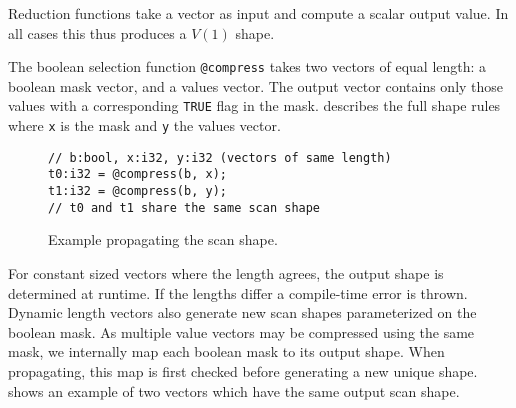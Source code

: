 Reduction functions take a vector as input and compute a scalar output value.  In all
cases this thus produces a $V(1)$ shape.

\begin{comment}
\begin{table}[htbp]
\centering
\caption{Rules for reduction functions (R)} \label{rule_reduction}
\begin{small}
\begin{tabular}{|c||c|c|c|c|}
\hline
$F_{R}$(x) & \shapeS & \shapeV{$c_0$} & \shapeV{$d_0$} & \shapeVS{$a_0$} \\ \hline
\hline
Return     & \shapeS & \shapeS & \shapeS & \shapeS \\ \hline
\end{tabular}
\end{small}
\end{table}
\end{comment}

The boolean selection function \texttt{@compress} takes two vectors of equal
length: a boolean mask vector, and a values vector. The output vector contains only
those values with a corresponding \texttt{TRUE} flag in the mask. 
describes the full shape rules where \texttt{x} is the mask and \texttt{y} the values
vector.

\begin{figure}[htbp]
\begin{lstlisting}[language=HorseIR, frame=single, basicstyle=\footnotesize]
// b:bool, x:i32, y:i32 (vectors of same length)
t0:i32 = @compress(b, x);
t1:i32 = @compress(b, y);
// t0 and t1 share the same scan shape
\end{lstlisting}
\caption{Example propagating the scan shape.} \label{fig:scan_shape}
\end{figure}

For constant sized vectors where the length agrees, the output shape is determined at
runtime. If the lengths differ a compile-time error is thrown. Dynamic length vectors
also generate new scan shapes parameterized on the boolean mask. As multiple value
vectors may be compressed using the same mask, we internally map each boolean mask
to its output shape. When propagating, this map is first checked before generating
a new unique shape.  shows an example of two vectors which
have the same output scan shape.


